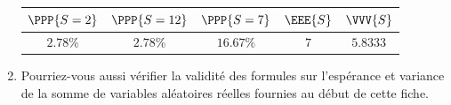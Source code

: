 \documentclass[10pt]{report}
\begin{document}
\begin{exercice}
\begin{enumerate}
\begin{tabular}{|c|c|c|c|c|}\hline
\phantom{$\Big($}$\PPP{S=2}$&\phantom{$\Big($}$\PPP{S=12}$&\phantom{$\Big($}$\PPP{S=7}$&\phantom{$\Big($}$\EEE{S}$&\phantom{$\Big($}$\VVV{S}$
\\\hline
\phantom{$\Big($}$2.78\%$&\phantom{$\Big($}$2.78\%$&\phantom{$\Big($}$16.67\%$&\phantom{$\Big($}$7$&\phantom{$\Big($}$5.8333$
\\\hline
\end{tabular}


\item Pourriez-vous aussi vérifier la validité des formules sur l'espérance et variance de la somme de variables aléatoires réelles fournies au début de cette fiche. 

\end{enumerate}
\end{exercice}
\end{document}
